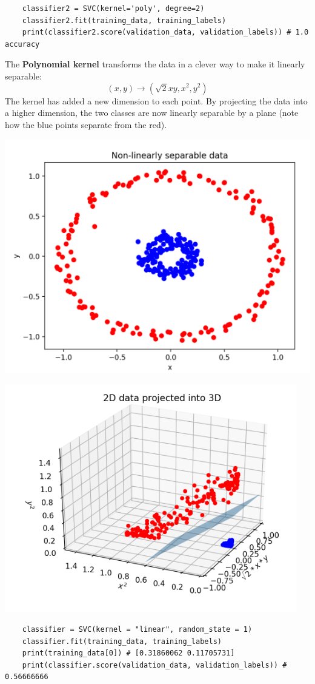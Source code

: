 \documentclass[11pt, a4paper]{article}
\begin{document}
\begin{spacing}{1.1}
\begin{lstlisting}
	classifier2 = SVC(kernel='poly', degree=2)
	classifier2.fit(training_data, training_labels)
	print(classifier2.score(validation_data, validation_labels)) # 1.0 accuracy	\end{lstlisting} \vspace*{1mm}
	The \textbf{Polynomial kernel} transforms the data in a clever way to make it linearly separable: $$ (x,y) \rightarrow (\sqrt{2}xy, x^2, y^2) $$ The kernel has added a new dimension to each point. By projecting the data into a higher dimension, the two classes are now linearly separable by a plane (note how the blue points separate from the red). \\
	\begin{minipage}[c]{9cm}
		\includegraphics[scale=.5]{pk}
	\end{minipage}
	\begin{minipage}[c]{9cm}
		\includegraphics[scale=.5]{pk2}
	\end{minipage}
	\begin{lstlisting}
	classifier = SVC(kernel = "linear", random_state = 1)
	classifier.fit(training_data, training_labels)
	print(training_data[0]) # [0.31860062 0.11705731]
	print(classifier.score(validation_data, validation_labels)) # 0.56666666
	

\end{lstlisting}
\end{spacing}
\end{document}
